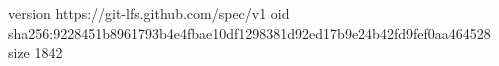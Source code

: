 version https://git-lfs.github.com/spec/v1
oid sha256:9228451b8961793b4e4fbae10df1298381d92ed17b9e24b42fd9fef0aa464528
size 1842
